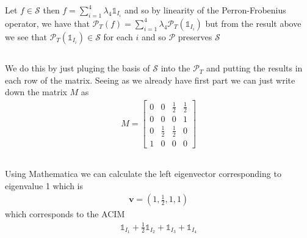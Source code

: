 \documentclass{unswmaths}
\begin{document}
    Let $ f \in \mathcal{S} $ then $ f = \sum_{i=1}^4 \lambda_4 \mathds{1}_{I_i} $ and so by linearity of the Perron-Frobenius operator, we have that $ \mathcal{P}_T(f) = \sum_{i=1}^4 \lambda_4 \mathcal{P}_T(\mathds{1}_{I_i}) $ but from the result above we see that $ \mathcal{P}_T(\mathds{1}_{I_i}) \in \mathcal{S} $ for each $ i $ and so $ \mathcal{P} $ preserves $ \mathcal{S} $
\subsection{}
    We do this by just pluging the basis of $ \mathcal{S} $ into the $ \mathcal{P}_T $ and putting the results in each row of the matrix. Seeing as we already have first part we can just write down the matrix $ M $ as
    \begin{align}
        M = \left[ 
        \begin{array}{cccc}
            0 & 0 & \frac{1}{2} & \frac{1}{2} \\
            0 & 0 & 0 & 1 \\
            0 & \frac{1}{2} & \frac{1}{2} & 0 \\
            1 & 0 & 0 & 0 
        \end{array}
        \right]
    \end{align}
\subsection{}
    Using Mathematica we can calculate the left eigenvector corresponding to eigenvalue 1 which is
    \begin{align}
        \mathbf{v} = (1,\frac{1}{2},1,1)
    \end{align}
    which corresponds to the ACIM
    \begin{align}
        \mathds{1}_{I_1} + \frac{1}{2}\mathds{1}_{I_2} + \mathds{1}_{I_3} + \mathds{1}_{I_4}
    \end{align}
    
\section{}
\end{document}
